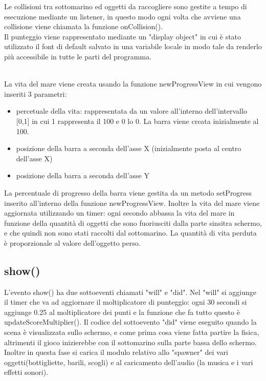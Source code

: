 \documentclass[12pt]{article}
\begin{document}
Le collisioni tra sottomarino ed oggetti da raccogliere sono gestite a tempo di esecuzione mediante un listener, in questo modo ogni volta che avviene una collisione viene chiamata la funzione onCollision(). 
\\

Il punteggio viene rappresentato mediante un "display object" in cui è stato utilizzato il font di default salvato in una variabile locale in modo tale da renderlo più accessibile in tutte le parti del programma. 

\\
La vita del mare viene creata usando la funzione newProgressView in cui vengono inseriti 3 parametri:
\begin{itemize}
    \item percetuale della vita: rappresentata da un valore all'interno dell'intervallo [0,1] in cui 1 rappresenta il 100 e 0 lo 0. La barra viene creata inizialmente al 100.
    \item posizione della barra a seconda dell'asse X (inizialmente posta al centro dell'asse X)
    \item posizione della barra a seconda dell'asse Y
\end{itemize}
La percentuale di progresso della barra viene gestita da un metodo setProgress inserito all'interno della funzione newProgressView. Inoltre la vita del mare viene aggiornata utilizzando un timer: ogni secondo abbassa la vita del mare in funzione della quantità di oggetti che sono fuoriusciti dalla parte sinsitra schermo, e che quindi non sono stati raccolti dal sottomarino. La quantità di vita perduta è proporzionale al valore dell'oggetto perso.

\subsection{show()}
L'evento show() ha due sottoeventi chiamati "will" e "did". Nel "will" si aggiunge il timer che va ad aggiornare il moltiplicatore di punteggio: ogni 30 secondi si aggiunge 0.25 al moltiplicatore dei punti e la funzione che fa tutto questo è updateScoreMultiplier(). Il codice del sottoevento "did" viene eseguito quando la scena è visualizzata sullo schermo, e come prima cosa viene fatta partire la fisica, altrimenti il gioco inizierebbe con il sottomarino sulla parte bassa dello schermo. Inoltre in questa fase si carica il modulo relativo allo "spawner" dei vari oggetti(bottigliette, barili, scogli) e al caricamento dell'audio (la musica e i vari effetti sonori).
\end{document}

